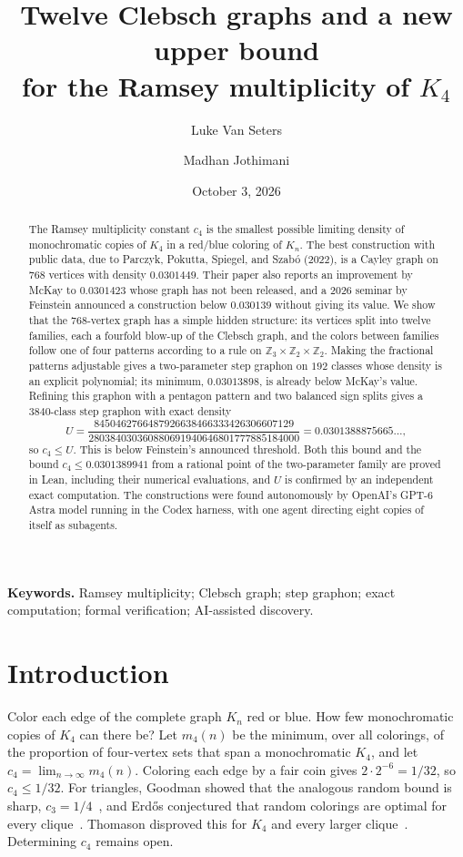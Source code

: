 \documentclass[11pt]{article}
\title{Twelve Clebsch graphs and a new upper bound\\ for the Ramsey multiplicity of $K_4$}
\author{Luke Van Seters \and Madhan Jothimani}
\date{October 3, 2026}
\theoremstyle{definition}
\theoremstyle{remark}
\newcommand{\Z}{\mathbb Z}
\begin{document}
\maketitle
\begin{abstract}
The Ramsey multiplicity constant $c_4$ is the smallest possible limiting density of monochromatic copies of $K_4$ in a red/blue coloring of $K_n$.
The best construction with public data, due to Parczyk, Pokutta, Spiegel, and Szab\'o (2022), is a Cayley graph on $768$ vertices with density $0.0301449$.
Their paper also reports an improvement by McKay to $0.0301423$ whose graph has not been released, and a 2026 seminar by Feinstein announced a construction below $0.030139$ without giving its value.
We show that the 768-vertex graph has a simple hidden structure: its vertices split into twelve families, each a fourfold blow-up of the Clebsch graph, and the colors between families follow one of four patterns according to a rule on $\Z_3\times\Z_2\times\Z_2$.
Making the fractional patterns adjustable gives a two-parameter step graphon on $192$ classes whose density is an explicit polynomial; its minimum, $0.03013898$, is already below McKay's value.
Refining this graphon with a pentagon pattern and two balanced sign splits gives a $3840$-class step graphon with exact density
\[
 U=\frac{8450462766487926638466333426306607129}{280384030360880691940646801777885184000}=0.0301388875665\ldots,
\]
so $c_4\le U$.
This is below Feinstein's announced threshold.
Both this bound and the bound $c_4\le0.0301389941$ from a rational point of the two-parameter family are proved in Lean, including their numerical evaluations, and $U$ is confirmed by an independent exact computation.
The constructions were found autonomously by OpenAI's GPT-6 Astra model running in the Codex harness, with one agent directing eight copies of itself as subagents.
\end{abstract}

\noindent\textbf{Keywords.} Ramsey multiplicity; Clebsch graph; step graphon; exact computation; formal verification; AI-assisted discovery.

\section{Introduction}
\label{sec:intro}

Color each edge of the complete graph $K_n$ red or blue.
How few monochromatic copies of $K_4$ can there be?
Let $m_4(n)$ be the minimum, over all colorings, of the proportion of four-vertex sets that span a monochromatic $K_4$, and let $c_4=\lim_{n\to\infty}m_4(n)$.
Coloring each edge by a fair coin gives $2\cdot2^{-6}=1/32$, so $c_4\le 1/32$.
For triangles, Goodman showed that the analogous random bound is sharp, $c_3=1/4$~\cite{goodman1959}, and Erd\H{o}s conjectured that random colorings are optimal for every clique~\cite{erdos1962}.
Thomason disproved this for $K_4$ and every larger clique~\cite{thomason1989}.
Determining $c_4$ remains open.
\end{document}
